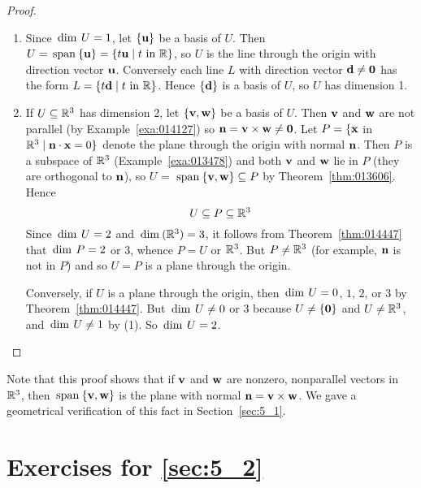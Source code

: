 \begin{proof}
\begin{enumerate}
\item Since $\thinspace\operatorname{dim\medspace} U = 1$, let $\{\textbf{u}\}$ be a basis of $U$. Then $U = \thinspace\operatorname{span\medspace}\{\textbf{u}\} = \{t\textbf{u} \mid t \mbox{ in }\mathbb{R}\}$, so $U$ is the line through the origin with direction vector $\textbf{u}$. Conversely each line $L$ with direction vector $\textbf{d} \neq \textbf{0}$ has the form $L = \{t\textbf{d} \mid t \mbox{ in }\mathbb{R}\}$. Hence $\{\textbf{d}\}$ is a basis of $U$, so $U$ has dimension 1.

\item If $U \subseteq \mathbb{R}^3$ has dimension 2, let $\{\textbf{v}, \textbf{w}\}$ be a basis of $U$. Then $\textbf{v}$ and $\textbf{w}$ are not parallel (by Example~\ref{exa:014127}) so $\textbf{n} = \textbf{v} \times \textbf{w} \neq \textbf{0}$. Let $P = \{\textbf{x}$ in $\mathbb{R}^3 \mid \textbf{n} \cdot \textbf{x} = 0\}$ denote the plane through the origin with normal $\textbf{n}$. Then $P$ is a subspace of $\mathbb{R}^3$ (Example~\ref{exa:013478}) and both $\textbf{v}$ and $\textbf{w}$ lie in $P$ (they are orthogonal to $\textbf{n}$), so $U$ = $\thinspace\operatorname{span\medspace}\{\textbf{v}, \textbf{w}\} \subseteq P$ by Theorem~\ref{thm:013606}. Hence
\begin{equation*}
U \subseteq P \subseteq \mathbb{R}^3
\end{equation*}
Since $\thinspace\operatorname{dim\medspace} U = 2$ and $\thinspace\operatorname{dim\medspace}(\mathbb{R}^3) = 3$, it follows from Theorem~\ref{thm:014447} that $\thinspace\operatorname{dim\medspace} P = 2$ or $3$, whence $P = U$ or $\mathbb{R}^3$. But $P \neq \mathbb{R}^3$ (for example, $\textbf{n}$ is not in $P$) and so $U = P$ is a plane through the origin.

Conversely, if $U$ is a plane through the origin, then $\thinspace\operatorname{dim\medspace} U = 0$, $1$, $2$, or $3$ by Theorem~\ref{thm:014447}. But $\thinspace\operatorname{dim\medspace} U \neq 0$ or $3$ because $U \neq \{\textbf{0}\}$ and $U \neq \mathbb{R}^3$, and $\thinspace\operatorname{dim\medspace} U \neq 1$ by (1). So $\thinspace\operatorname{dim\medspace} U = 2$.
\end{enumerate}
\vspace*{-2em}\end{proof}

\noindent Note that this proof shows that if $\textbf{v}$ and $\textbf{w}$ are nonzero, nonparallel vectors in $\mathbb{R}^3$, then $\thinspace\operatorname{span\medspace}\{\textbf{v}, \textbf{w}\}$ is the plane with normal $\textbf{n} = \textbf{v} \times \textbf{w}$. We gave a geometrical verification of this fact in Section~\ref{sec:5_1}.

\section*{Exercises for \ref{sec:5_2}}

